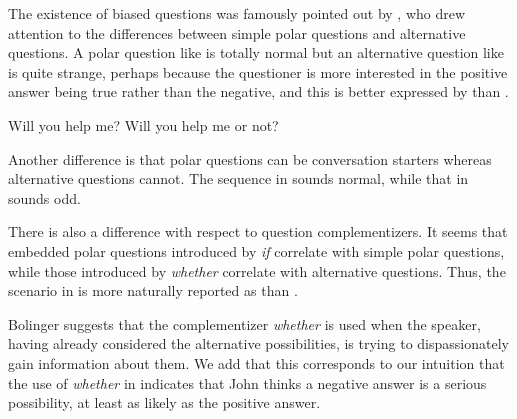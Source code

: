 \documentclass[output=paper,colorlinks,citecolor=brown]{langscibook}
\begin{document}
The existence of biased questions was famously pointed out  by \citet{Bolinger:1978}, who drew attention to the differences between simple polar questions and alternative questions. A polar question like  is totally normal but an alternative question like  is quite strange, perhaps because the questioner is more interested in the positive answer being true rather than the negative, and this is better expressed by  than .

\ea
\ea\label{whetherhelp}
Will you help me?
\ex\label{whetherhelpornot}
Will you help me or not?
\z
\z

Another difference is that polar questions can be conversation starters whereas alternative questions cannot. The sequence in  sounds normal, while that in  sounds odd.

\ea
{}\label{starter}
\label{nonstarter}
\z
\z

There is also a difference with respect to question complementizers. It seems that embedded polar questions introduced by \textit{if} correlate with simple polar questions, while those introduced by \textit{whether} correlate with alternative questions. Thus, the scenario in  is more naturally reported as  than . 

\label{willyoumarryme}
\label{ifmarry}
\label{whethermarry}
\z

Bolinger suggests that the complementizer \textit{whether} is used when the speaker, having already considered the alternative possibilities, is trying to dispassionately gain information about them. We add that this corresponds to our intuition that the use of \emph{whether} in  indicates that John thinks a negative answer is a serious possibility, at least as likely as the positive answer.
\end{document}
